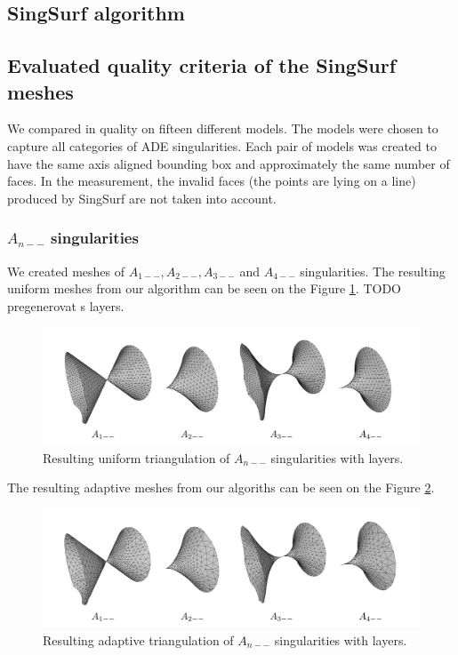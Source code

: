 \subsection{SingSurf algorithm}
\subsection{Evaluated quality criteria of the SingSurf meshes}
We compared in quality on fifteen different models. The models were chosen
to capture all categories of ADE singularities. Each pair of models was 
created to have the same axis aligned bounding box and approximately the
same number of faces. In the measurement, the invalid faces 
(the points are lying on a line) produced by SingSurf are not taken into 
account.

\subsubsection*{$A_{n--}$ singularities}
We created meshes of $A_{1--}, A_{2--}, A_{3--}$ and $A_{4--}$ singularities.
The resulting uniform meshes from our algorithm can be seen on the 
Figure \ref{img:61}. TODO pregenerovat s layers.

\begin{figure}
    \centerline{\includegraphics[scale=0.5]{images/img61}}
    \caption[Resulting uniform triangulation of $A_{n--}$ singularities]
    {Resulting uniform triangulation of $A_{n--}$ singularities with layers.}
    \label{img:61}
\end{figure} 
The resulting adaptive meshes from our algoriths can be seen on the 
Figure \ref{img:60}.

\begin{figure}
    \centerline{\includegraphics[scale=0.5]{images/img60}}
    \caption[Resulting adaptive triangulation of $A_{n--}$ singularities]
    {Resulting adaptive triangulation of $A_{n--}$ singularities with layers.}
    \label{img:60}
\end{figure}


